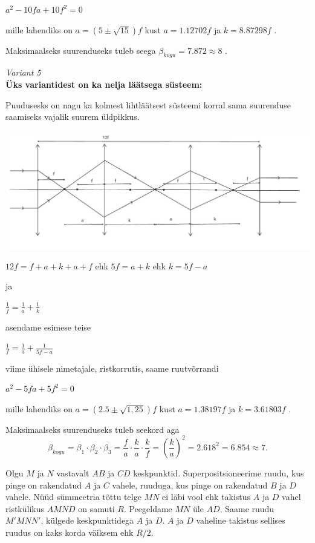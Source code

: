 \documentclass[10pt]{article}
\begin{document}
$ a^2 - 10fa + 10f^2 =0 $

mille lahendiks on $ a = (5 \pm \sqrt{15}) f $ kust $a=1.12702f $ ja $k=8.87298f$ .

Maksimaalseks suurenduseks tuleb seega $ {\beta}_{kogu} = 7.872 \approx 8 $ .

\emph{Variant 5}\\
\textbf {Üks variantidest on ka nelja läätsega süsteem:}

Puudusesks on nagu ka kolmest lihtläätsest süsteemi korral sama suurenduse saamiseks vajalik suurem üldpikkus.

\vspace{-10pt}
  \begin{center}
    \includegraphics[width=1\textwidth]{2020-v2g-10-yl5.pdf}
  \end{center}
  \vspace{-10pt}


$ 12f = f + a + k + a + f $ ehk $ 5f = a + k $ ehk $ k = 5f - a $

ja

$ \frac {1}{f} = \frac{1}{a} + \frac{1}{k} $

asendame esimese teise

$ \frac{1}{f} = \frac {1}{a} + \frac{1}{5f - a} $

viime ühisele nimetajale, ristkorrutis, saame ruutvõrrandi

$ a^2 - 5fa + 5f^2 =0 $

mille lahendiks on $ a = (2.5 \pm \sqrt{1,25}) f $ kust $a=1.38197f $ ja $k=3.61803f$ .

Maksimaalseks suurenduseks tuleb seekord aga  
\[ {\beta}_{kogu} = {\beta}_1 \cdot {\beta}_2 \cdot {\beta}_3 = \frac {f}{a} \cdot \frac {k}{a} \cdot \frac {k}{f} = {(\frac {k}{a})}^2 = 2.618^2 = 6.854 \approx 7. \]
\probend
\bigskip

\setAuthor{}

\solu
Olgu $M$ ja $N$ vastavalt $AB$ ja $CD$ keskpunktid. Superpositsioneerime
ruudu, kus pinge on rakendatud $A$ ja $C$ vahele, ruuduga, kus pinge on
rakendatud $B$ ja $D$ vahele. Nüüd sümmeetria tõttu telge $MN$ ei läbi vool
ehk takistus $A$ ja $D$ vahel ristkülikus $AMND$ on samuti $R$. Peegeldame
$MN$ üle $AD$. Saame ruudu $M'MNN'$, külgede keskpunktidega $A$ ja $D$. $A$ ja
$D$ vaheline takistus sellises ruudus on kaks korda väiksem ehk $R/2$.
\probend
\bigskip
\end{document}
